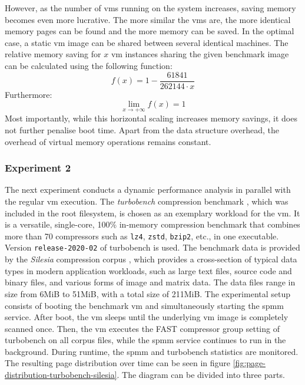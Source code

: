 However, as the number of \acp{vm} running on the system increases, saving memory becomes even more lucrative.
The more similar the \acp{vm} are, the more identical memory pages can be found and the more memory can be saved.
In the optimal case, a static \ac{vm} image can be shared between several identical machines.
The relative memory saving for $x$ \ac{vm} instances sharing the given benchmark image can be calculated using the following function:
$$f(x) = 1 - \frac{61841}{262144 \cdot x}$$
Furthermore:
$$ \lim_{x \to +\infty} f(x) = 1$$
Most importantly, while this horizontal scaling increases memory savings, it does not further penalise boot time.
Apart from the  data structure overhead, the overhead of virtual memory operations remains constant.

%  

\subsubsection*{Experiment 2}
\label{subsubsec:ex2}

The next experiment conducts a dynamic performance analysis in parallel with the regular \ac{vm} execution.
The \emph{turbobench} compression benchmark \cite{turbobench}, which was included in the root filesystem, is chosen as an exemplary workload for the \ac{vm}.
It is a versatile, single-core, 100\% in-memory compression benchmark that combines more than 70 compressors such as \texttt{lz4}, \texttt{zstd}, \texttt{bzip2}, etc., in one executable.
Version \texttt{release-2020-02} of turbobench is used.
The benchmark data is provided by the \emph{Silesia} compression corpus \cite{silesia-corpus}, which provides a cross-section of typical data types in modern application workloads, such as large text files, source code and binary files, and various forms of image and matrix data.
The data files range in size from 6MiB to 51MiB, with a total size of 211MiB.
The experimental setup consists of booting the benchmark \ac{vm} and simultaneously starting the \ac{spmm} service.
After boot, the \ac{vm} sleeps until the underlying \ac{vm} image is completely scanned once.
Then, the \ac{vm} executes the FAST compressor group setting of turbobench on all corpus files, while the \ac{spmm} service continues to run in the background.
During runtime, the \ac{spmm} and turbobench statistics are monitored.
The resulting page distribution over time can be seen in figure \ref{fig:page-distribution-turbobench-silesia}.
The diagram can be divided into three parts.

